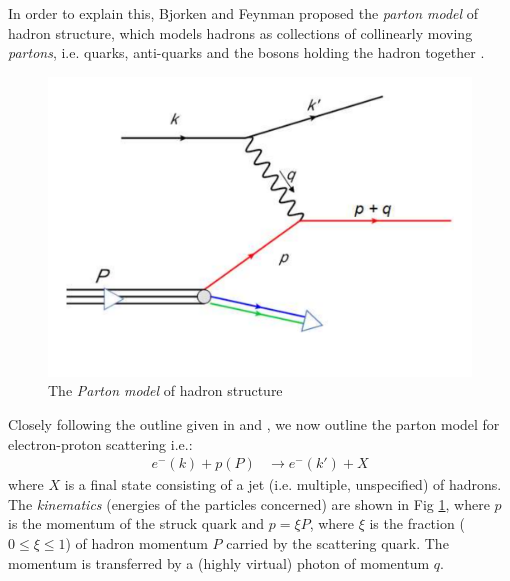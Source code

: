 \documentclass[12pt,a4paper]{report}
\newcommand*{\lr}[1]{\left( {#1} \right)}
\begin{document}
In order to explain this, Bjorken and Feynman proposed the \emph{parton model} of hadron structure, which models hadrons as collections of collinearly moving \emph{partons}, i.e. quarks, anti-quarks and the bosons holding the hadron together \cite[pg 54]{PeskinSchroeder}.

\begin{figure}[h]
\begin{center}
\includegraphics[scale=0.3]{Parton_Model.pdf}
\caption{The \emph{Parton model} of hadron structure \cite[pg 54]{Gardi:QCD}}
\label{fig:Parton_Model}
\end{center}
\end{figure}

Closely following the outline given in \cite[chapter 11]{Gardi:QCD} and \cite[chapter 14]{PeskinSchroeder}, we now outline the parton model for electron-proton scattering i.e.:
\begin{align}
e^{-} \lr{k} + p \lr{P} &\rightarrow e^{-} \lr{k'} + X
\end{align}
where $X$ is a final state consisting of a jet (i.e. multiple, unspecified) of hadrons. The \emph{kinematics} (energies of the particles concerned) are shown in Fig \ref{fig:Parton_Model}, where $p$ is the momentum of the struck quark and $p=\xi P$, where $\xi$ is the fraction ($0 \le \xi \le 1$) of hadron momentum $P$ carried by the scattering quark. The momentum is transferred by a (highly virtual) photon of momentum $q$.
\end{document}
